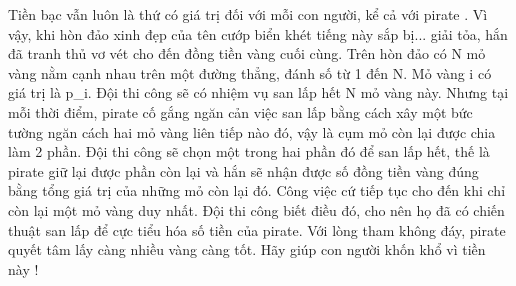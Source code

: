Tiền bạc vẫn luôn là thứ có giá trị đối với mỗi con người, kể cả với   pirate   . Vì vậy, khi hòn đảo xinh đẹp của tên cướp biển khét tiếng này sắp bị... giải tỏa, hắn đã tranh thủ vơ vét cho đến đồng tiền vàng cuối cùng. Trên hòn đảo có N mỏ vàng nằm cạnh nhau trên một đường thẳng, đánh số từ 1 đến N. Mỏ vàng i có giá trị là p\_i. Đội thi công sẽ có nhiệm vụ san lấp hết N mỏ vàng này. Nhưng tại mỗi thời điểm,   pirate   cố gắng ngăn cản việc san lấp bằng cách xây một bức tường ngăn cách hai mỏ vàng liên tiếp nào đó, vậy là cụm mỏ còn lại được chia làm 2 phần. Đội thi công sẽ chọn một trong hai phần đó để san lấp hết, thế là   pirate   giữ lại được phần còn lại và hắn sẽ nhận được số đồng tiền vàng đúng bằng tổng giá trị của những mỏ còn lại đó. Công việc cứ tiếp tục cho đến khi chỉ còn lại một mỏ vàng duy nhất. Đội thi công biết điều đó, cho nên họ đã có chiến thuật san lấp để cực tiểu hóa số tiền của pirate. Với lòng tham không đáy, pirate quyết tâm lấy càng nhiều vàng càng tốt. Hãy giúp con người khốn khổ vì tiền này !